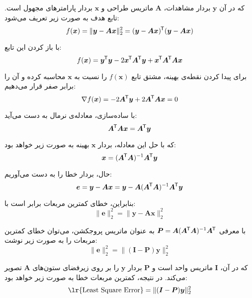 \documentclass[12pt,onecolumn,a4paper]{article}
\newcommand*{\transpose}{{\mkern-1.5mu\mathsf{T}}}
\begin{document}
	که در آن \( \bm{y} \) بردار مشاهدات، \( \bm{A} \) ماتریس طراحی و \( \bm{x} \) بردار پارامترهای مجهول است. تابع هدف به صورت زیر تعریف می‌شود:
	\begin{equation}
		f(\bm{x}) = \| \bm{y} - \bm{A} \bm{x} \|_2^2 = (\bm{y} - \bm{A} \bm{x})^\transpose (\bm{y} - \bm{A} \bm{x})
	\end{equation}
	
	با باز کردن این تابع:
	\begin{equation}
		f(\bm{x}) = \bm{y}^\transpose \bm{y} - 2 \bm{x}^\transpose \bm{A}^\transpose \bm{y} + \bm{x}^\transpose \bm{A}^\transpose \bm{A} \bm{x}
	\end{equation}
	
	برای پیدا کردن نقطه‌ی بهینه، مشتق تابع \( f(\bm{x}) \) را نسبت به \( \bm{x} \) محاسبه کرده و آن را برابر صفر قرار می‌دهیم:
	\begin{equation}
		{\nabla} f(\bm{x}) = -2 \bm{A}^\transpose \bm{y} + 2 \bm{A}^\transpose \bm{A} \bm{x} = 0
	\end{equation}
	
	با ساده‌سازی، معادله‌ی نرمال به دست می‌آید:
	\begin{equation}
		\bm{A}^\transpose \bm{A} \bm{x} = \bm{A}^\transpose \bm{y}
	\end{equation}
	
	که با حل این معادله، بردار \( \bm{x} \) بهینه به صورت زیر خواهد بود:
	\begin{equation}
		\bm{x} = (\bm{A}^\transpose \bm{A})^{-1} \bm{A}^\transpose \bm{y}
	\end{equation}
	
	حال، بردار خطا را به دست می‌آوریم:
	\begin{equation}
		\bm{e} = \bm{y} - \bm{A} \bm{x} = \bm{y} - \bm{A} (\bm{A}^\transpose \bm{A})^{-1} \bm{A}^\transpose \bm{y}
	\end{equation}
	
	بنابراین، خطای کمترین مربعات برابر است با:
	\begin{equation}
		\| \bm{e} \|_2^2 = \| \bm{y} - \bm{A} \bm{x} \|_2^2
	\end{equation}
	
	با معرفی \( \bm{P} = \bm{A} (\bm{A}^\transpose \bm{A})^{-1} \bm{A}^\transpose \) به عنوان ماتریس پروجکشن، می‌توان خطای کمترین مربعات را به صورت زیر نوشت:
	\begin{equation}
		\| \bm{e} \|_2^2 = \| (\bm{I} - \bm{P}) \bm{y} \|_2^2
	\end{equation}
	
	که در آن، \( \bm{I} \) ماتریس واحد است و \( \bm{P} \) بردار \( \bm{y} \) را بر روی زیرفضای ستون‌های \( \bm{A} \) تصویر می‌کند. در نتیجه، کمترین مربعات خطا به صورت زیر خواهد بود:
	\begin{equation}
		\text{\lr{Least Square Error}} = \| (\bm{I} - \bm{P}) \bm{y} \|_2^2
	\end{equation}
	
\end{document}
